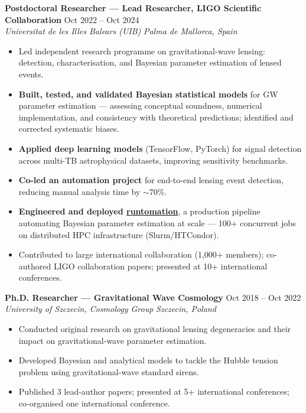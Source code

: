 \documentclass[10pt,a4paper]{article}
\newcommand{\cventry}[4]{%
  {\textbf{#1}} \hfill {\small #2}\\[-3pt]
  {\textit{\small #3}} \hfill {\textit{\small #4}}%
}
\begin{document}
\vspace{4pt}
\cventry{Postdoctoral Researcher — Lead Researcher, LIGO Scientific Collaboration}{Oct 2022 -- Oct 2024}{Universitat de les Illes Balears (UIB)}{Palma de Mallorca, Spain}
\begin{itemize}[noitemsep, topsep=3pt, leftmargin=1.2em]
  \item Led independent research programme on gravitational-wave lensing: detection, characterisation,
        and Bayesian parameter estimation of lensed events.
  \item \textbf{Built, tested, and validated Bayesian statistical models} for GW parameter estimation —
        assessing conceptual soundness, numerical implementation, and consistency with theoretical
        predictions; identified and corrected systematic biases.
  \item \textbf{Applied deep learning models} (TensorFlow, PyTorch) for signal detection across
        multi-TB astrophysical datasets, improving sensitivity benchmarks.
  \item \textbf{Co-led an automation project} for end-to-end lensing event detection, reducing manual
        analysis time by $\sim$70\%.
  \item \textbf{Engineered and deployed \href{https://github.com/PaoloCremo/runtomation}{runtomation}},
        a production pipeline automating Bayesian parameter estimation at scale — 100+ concurrent jobs
        on distributed HPC infrastructure (Slurm/HTCondor).
  \item Contributed to large international collaboration (1,000+ members); co-authored LIGO
        collaboration papers; presented at 10+ international conferences.
\end{itemize}

\vspace{4pt}
\cventry{Ph.D. Researcher — Gravitational Wave Cosmology}{Oct 2018 -- Oct 2022}{University of Szczecin, Cosmology Group}{Szczecin, Poland}
\begin{itemize}[noitemsep, topsep=3pt, leftmargin=1.2em]
  \item Conducted original research on gravitational lensing degeneracies and their impact on
        gravitational-wave parameter estimation.
  \item Developed Bayesian and analytical models to tackle the Hubble tension problem using
        gravitational-wave standard sirens.
  \item Published 3 lead-author papers; presented at 5+ international conferences; co-organised
        one international conference.
\end{itemize}
\end{document}
